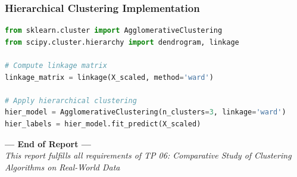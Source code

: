 \documentclass[12pt,a4paper]{article}
\begin{document}
\subsubsection{Hierarchical Clustering Implementation}
\begin{lstlisting}[language=Python, caption=Hierarchical clustering implementation]
from sklearn.cluster import AgglomerativeClustering
from scipy.cluster.hierarchy import dendrogram, linkage

# Compute linkage matrix
linkage_matrix = linkage(X_scaled, method='ward')

# Apply hierarchical clustering
hier_model = AgglomerativeClustering(n_clusters=3, linkage='ward')
hier_labels = hier_model.fit_predict(X_scaled)
\end{lstlisting}

\vfill

\begin{center}
\textbf{--- End of Report ---}\\[0.5cm]
\textit{This report fulfills all requirements of TP 06: Comparative Study of Clustering Algorithms on Real-World Data}
\end{center}
\end{document}
